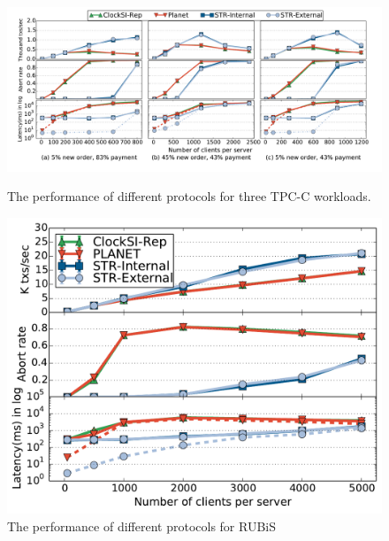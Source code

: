 \begin{figure}
\centering
\begin{minipage}{.72\textwidth}
\centering
  \includegraphics[scale=0.28]{figures/tpcc}
  \vspace{-5mm}
  \caption{\small The performance of different protocols for three TPC-C workloads.}
  \label{fig:tpcc}
\end{minipage}
\begin{minipage}{.26\textwidth}
\centering
  \includegraphics[scale=0.24]{figures/rubislatencywarehouse}
  \vspace{-2mm}
  \caption{\small The performance of different protocols for RUBiS}
  \label{fig:rubis}
\end{minipage}
\end{figure}


